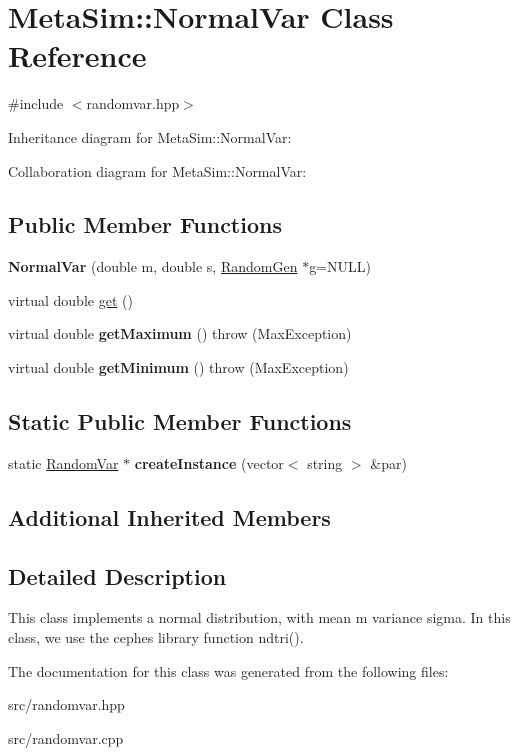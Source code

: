 \hypertarget{classMetaSim_1_1NormalVar}{}\section{Meta\+Sim\+:\+:Normal\+Var Class Reference}
\label{classMetaSim_1_1NormalVar}


{\ttfamily \#include $<$randomvar.\+hpp$>$}



Inheritance diagram for Meta\+Sim\+:\+:Normal\+Var\+:


Collaboration diagram for Meta\+Sim\+:\+:Normal\+Var\+:
\subsection*{Public Member Functions}
\begin{DoxyCompactItemize}
\item 
{\bfseries Normal\+Var} (double m, double s, \hyperlink{classMetaSim_1_1RandomGen}{Random\+Gen} $\ast$g=N\+U\+LL)
\item 
virtual double \hyperlink{group__metasim__random_ga17f84e2aa93a6cf9c5574f4714440c1e}{get} ()
\item 
virtual double {\bfseries get\+Maximum} ()  throw (\+Max\+Exception)
\item 
virtual double {\bfseries get\+Minimum} ()  throw (\+Max\+Exception)
\end{DoxyCompactItemize}
\subsection*{Static Public Member Functions}
\begin{DoxyCompactItemize}
\item 
static \hyperlink{classMetaSim_1_1RandomVar}{Random\+Var} $\ast$ {\bfseries create\+Instance} (vector$<$ string $>$ \&par)
\end{DoxyCompactItemize}
\subsection*{Additional Inherited Members}


\subsection{Detailed Description}
This class implements a normal distribution, with mean m variance sigma. In this class, we use the cephes library function ndtri(). 

The documentation for this class was generated from the following files\+:\begin{DoxyCompactItemize}
\item 
src/randomvar.\+hpp\item 
src/randomvar.\+cpp\end{DoxyCompactItemize}
